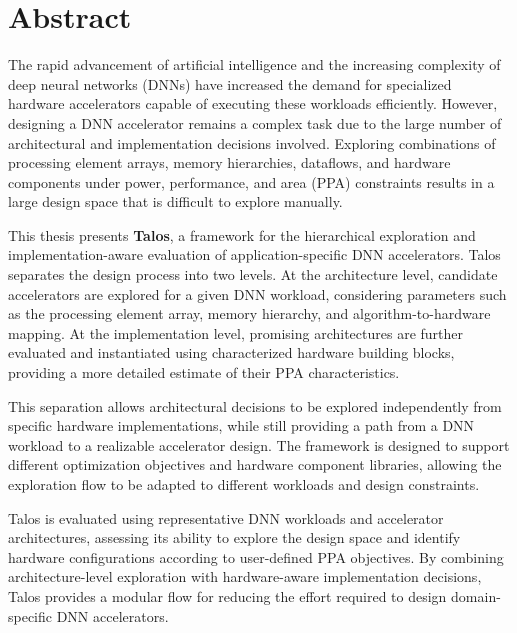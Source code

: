 \clearpage
\newpage
\section*{Abstract}

The rapid advancement of artificial intelligence and the increasing
complexity of deep neural networks (DNNs) have increased the demand
for specialized hardware accelerators capable of executing these
workloads efficiently. However, designing a DNN accelerator remains
a complex task due to the large number of architectural and
implementation decisions involved. Exploring combinations of
processing element arrays, memory hierarchies, dataflows, and
hardware components under power, performance, and area (PPA)
constraints results in a large design space that is difficult to
explore manually.

This thesis presents \textbf{Talos}, a framework for the hierarchical exploration
and implementation-aware evaluation of application-specific DNN accelerators.
Talos separates the
design process into two levels. At the architecture level, candidate
accelerators are explored for a given DNN workload, considering
parameters such as the processing element array, memory hierarchy,
and algorithm-to-hardware mapping. At the implementation level,
promising architectures are further evaluated and instantiated using
characterized hardware building blocks, providing a more detailed
estimate of their PPA characteristics.

This separation allows architectural decisions to be explored
independently from specific hardware implementations, while still
providing a path from a DNN workload to a realizable accelerator
design. The framework is designed to support different optimization
objectives and hardware component libraries, allowing the exploration
flow to be adapted to different workloads and design constraints.

Talos is evaluated using representative DNN workloads and accelerator
architectures, assessing its ability to explore the design space and
identify hardware configurations according to user-defined PPA
objectives. By combining architecture-level exploration with
hardware-aware implementation decisions, Talos provides a modular
flow for reducing the effort required to design domain-specific DNN
accelerators.
